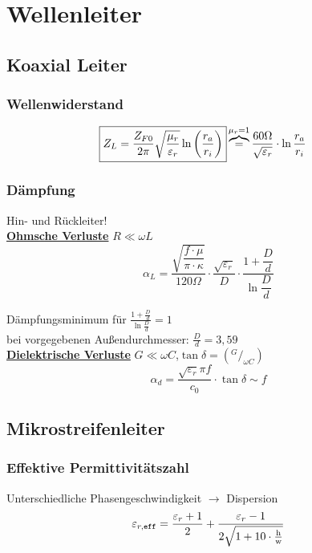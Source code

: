 \section{Wellenleiter}
\subsection{Koaxial Leiter}
\subsubsection{Wellenwiderstand}


\begin{align*}
    \Aboxed{Z_L &= \frac{Z_{F0}}{2\pi}\sqrt{\frac{\mu_r}{\varepsilon_r}}\ln\left( \frac{r_a}{r_i} \right)}  \overbrace{=}^{ \mu_r=1}\frac{60\Omega}{\sqrt{\varepsilon_r}}\cdot \ln{\frac{r_a}{r_i}}
\end{align*}

\subsubsection{Dämpfung}
Hin- und Rückleiter!\\
\underline{\textbf{Ohmsche Verluste}} $R\ll\omega L$
\[
    \alpha_L = \frac{\sqrt{\dfrac{f\cdot\mu}{\pi\cdot\kappa}}}{120\Omega}\cdot\frac{\sqrt{\varepsilon_r}}{D}\cdot\dfrac{1+\dfrac{D}{d}}{\ln \dfrac{D}{d}}
\]

Dämpfungsminimum für $ \frac{1+\tfrac{D}{d}}{\ln \tfrac{D}{d}} = 1 $\\ bei vorgegebenen Außendurchmesser: $ \frac{D}{d} =3,59 $\\

\underline{\textbf{Dielektrische Verluste}} $G\ll\omega C$,$\tan\delta= (^G/_{\omega C})$
\[
    \alpha_d = \frac{\sqrt{\varepsilon_r}\pi f}{c_0}\cdot\tan\delta \sim f
\]

\subsection{Mikrostreifenleiter}

\subsubsection{Effektive Permittivitätszahl}
Unterschiedliche Phasengeschwindigkeit $\rightarrow$ Dispersion
\[
         \varepsilon_{r,\texttt{eff}}  = \frac{\varepsilon_r+1}{2}+\frac{\varepsilon_r-1}{2\sqrt{1+10\cdot\frac{\text{h}}{\text{w}}}} \\
\]

